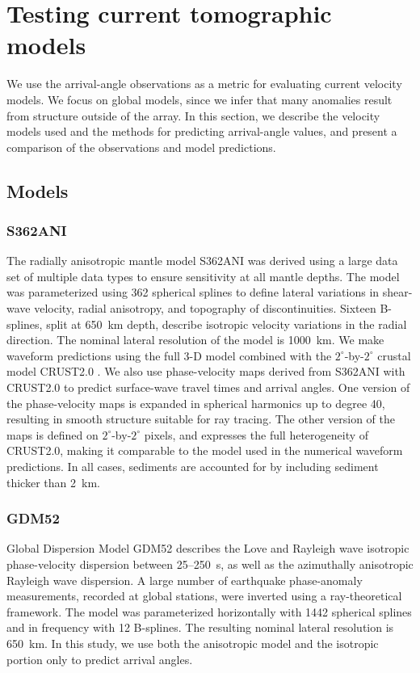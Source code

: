 \documentclass[12pt,oneside]{book}
\newcommand{\degree}[1]{\mbox{$#1^{\circ}$}}
\begin{document}
\section{Testing current tomographic models}
We use the arrival-angle observations as a metric for evaluating current velocity models. We focus on global models, since we infer that many anomalies result from structure outside of the array. In this section, we describe the velocity models used and the methods for predicting arrival-angle values, and present a comparison of the observations and model predictions. 

\subsection{Models}
\subsubsection*{S362ANI}
The radially anisotropic mantle model S362ANI \citep[][]{Kustowskietal2008} was derived using a large data set of multiple data types to ensure sensitivity at all mantle depths. The model was parameterized using 362 spherical splines to define lateral variations in shear-wave velocity, radial anisotropy, and topography of discontinuities. Sixteen B-splines, split at 650~km depth, describe isotropic velocity variations in the radial direction. The nominal lateral resolution of the model is 1000~km. We make waveform predictions using the full 3\nobreakdash-D model combined with the \degree{2}-by-\degree{2} crustal model CRUST2.0 \citep{CRUST2}. We also use phase-velocity maps derived from S362ANI with CRUST2.0 to predict surface-wave travel times and arrival angles. One version of the phase-velocity maps is expanded in spherical harmonics up to degree 40, resulting in smooth structure suitable for ray tracing. The other version of the maps is defined on \degree{2}-by-\degree{2} pixels, and expresses the full heterogeneity of CRUST2.0, making it comparable to the model used in the numerical waveform predictions. In all cases, sediments are accounted for by including sediment thicker than 2~km.

\subsubsection*{GDM52}
Global Dispersion Model GDM52 \citep[][]{Ekstrom2011} describes the Love and Rayleigh wave isotropic phase-velocity dispersion between 25--250~s, as well as the azimuthally anisotropic Rayleigh wave dispersion. A large number of earthquake phase-anomaly measurements, recorded at global stations, were inverted using a ray-theoretical framework. The model was parameterized horizontally with 1442 spherical splines and in frequency with 12 B-splines. The resulting nominal lateral resolution is 650~km. In this study, we use both the anisotropic model and the isotropic portion only to predict arrival angles. 
\end{document}
